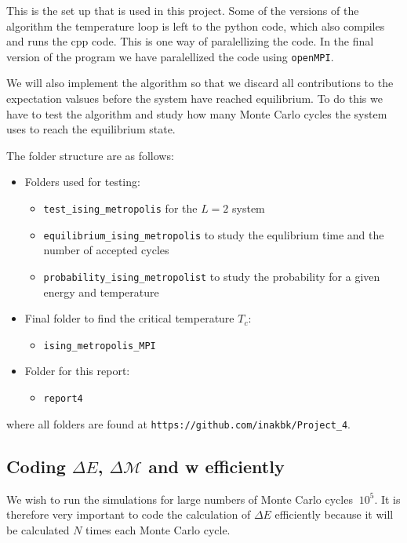 \documentclass[11pt,a4wide]{article}
\begin{document}
This is the set up that is used in this project. Some of the versions of the algorithm the temperature loop is left to the python code, which also compiles and runs the cpp code. This is one way of paralellizing the code. In the final version of the program we have paralellized the code using \texttt{openMPI}. 

We will also implement the algorithm so that we discard all contributions to the expectation valsues before the system have reached equilibrium. To do this we have to test the algorithm and study how many Monte Carlo cycles the system uses to reach the equilibrium state. 

The folder structure are as follows:
\begin{itemize}
\item Folders used for testing:
\begin{itemize}
\item \texttt{test\_ising\_metropolis} for the $L=2$ system
\item \texttt{equilibrium\_ising\_metropolis} to study the equlibrium time and the number of accepted cycles
\item \texttt{probability\_ising\_metropolist} to study the probability for a given energy and temperature
\end{itemize}
\item Final folder to find the critical temperature $T_c$:
\begin{itemize}
\item \texttt{ising\_metropolis\_MPI}
\end{itemize}
\item Folder for this report:
\begin{itemize}
\item \texttt{report4}
\end{itemize}
\end{itemize}
where all folders are found at \texttt{https://github.com/inakbk/Project\_4}.

\subsection{Coding $\Delta E$, $\Delta \mathcal{M}$  and w efficiently}
We wish to run the simulations for large numbers of Monte Carlo cycles $~10^5$. It is therefore very important to code the calculation of $\Delta E$ efficiently because it will be calculated $N$ times each Monte Carlo cycle. 
\end{document}
